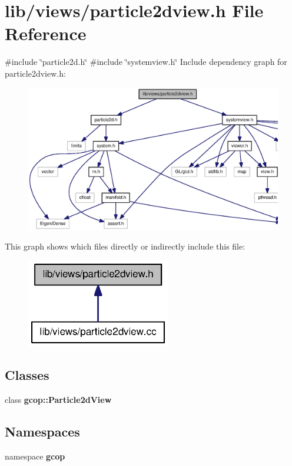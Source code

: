 \section{lib/views/particle2dview.h \-File \-Reference}
\label{particle2dview_8h}
{\ttfamily \#include \char`\"{}particle2d.\-h\char`\"{}}\*
{\ttfamily \#include \char`\"{}systemview.\-h\char`\"{}}\*
\-Include dependency graph for particle2dview.\-h\-:\nopagebreak
\begin{figure}[H]
\begin{center}
\leavevmode
\includegraphics[width=350pt]{particle2dview_8h__incl}
\end{center}
\end{figure}
\-This graph shows which files directly or indirectly include this file\-:\nopagebreak
\begin{figure}[H]
\begin{center}
\leavevmode
\includegraphics[width=178pt]{particle2dview_8h__dep__incl}
\end{center}
\end{figure}
\subsection*{\-Classes}
\begin{DoxyCompactItemize}
\item 
class {\bf gcop\-::\-Particle2d\-View}
\end{DoxyCompactItemize}
\subsection*{\-Namespaces}
\begin{DoxyCompactItemize}
\item 
namespace {\bf gcop}
\end{DoxyCompactItemize}
